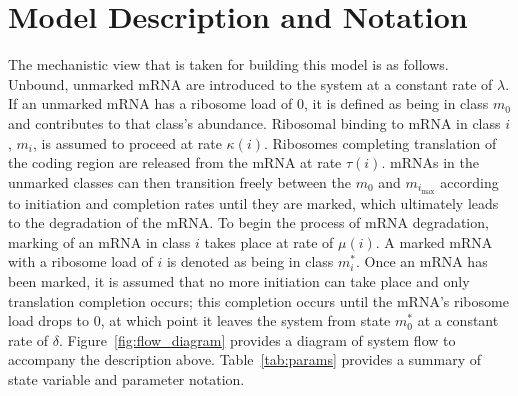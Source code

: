 \documentclass[review]{elsarticle}
\newcommand{\imax}{\ensuremath{i_{\max}}\xspace}
\begin{document}
\section{Model Description and Notation}\label{sec:description}
The mechanistic view that is taken for building this model is as follows.
Unbound, unmarked mRNA are introduced to the system at a constant rate of $\lambda$.
If an unmarked mRNA has a ribosome load of 0, it is defined as being in class $m_0$ and contributes to that class's abundance.
Ribosomal binding to mRNA in class $i$, $m_i$, is assumed to proceed at rate $\kappa(i)$. %
Ribosomes completing translation of the coding region are released from the mRNA at rate $\tau(i)$.  %
mRNAs in the unmarked classes can then transition freely between the $m_0$ and $m_{\imax}$ according to initiation and completion rates until they are marked, which ultimately leads to the degradation of the mRNA.
To begin the process of mRNA degradation, marking of an mRNA in class $i$ takes place at rate of $\mu(i)$.
A marked mRNA with a ribosome load of $i$ is denoted as being in class $m_i^*$.
Once an mRNA has been marked, it is assumed that no more initiation can take place and only translation completion occurs; this completion occurs until the mRNA's ribosome load drops to 0, at which point it leaves the system from state $m_0^*$ at a constant rate of $\delta$.
Figure~\ref{fig:flow_diagram} provides a diagram of system flow to accompany the description above.
Table~\ref{tab:params} provides a summary of state variable and parameter notation.
\end{document}
